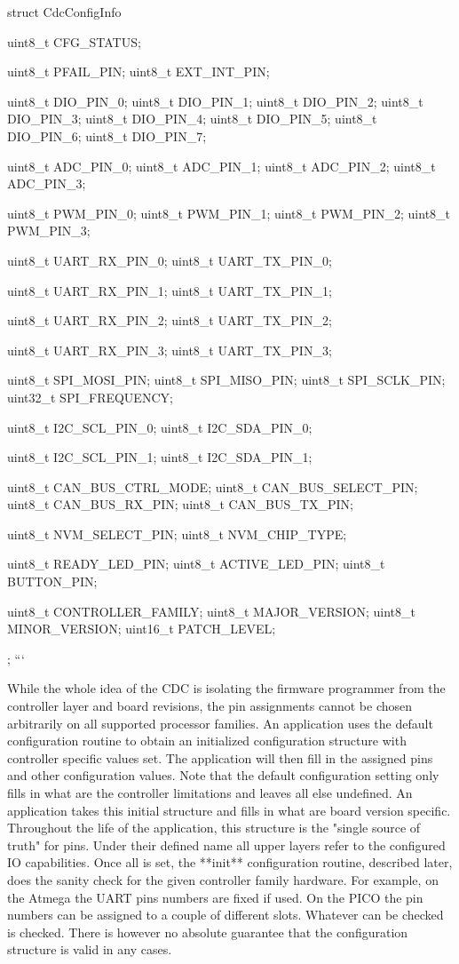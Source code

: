 struct CdcConfigInfo {

    uint8_t   CFG_STATUS;

    uint8_t   PFAIL_PIN;
    uint8_t   EXT_INT_PIN;

    uint8_t   DIO_PIN_0;
    uint8_t   DIO_PIN_1;
    uint8_t   DIO_PIN_2;
    uint8_t   DIO_PIN_3;
    uint8_t   DIO_PIN_4;
    uint8_t   DIO_PIN_5;
    uint8_t   DIO_PIN_6;
    uint8_t   DIO_PIN_7;

    uint8_t   ADC_PIN_0;
    uint8_t   ADC_PIN_1;
    uint8_t   ADC_PIN_2;
    uint8_t   ADC_PIN_3;

    uint8_t   PWM_PIN_0;
    uint8_t   PWM_PIN_1;
    uint8_t   PWM_PIN_2;
    uint8_t   PWM_PIN_3;

    uint8_t   UART_RX_PIN_0;
    uint8_t   UART_TX_PIN_0;

    uint8_t   UART_RX_PIN_1;
    uint8_t   UART_TX_PIN_1;

    uint8_t   UART_RX_PIN_2;
    uint8_t   UART_TX_PIN_2;

    uint8_t   UART_RX_PIN_3;
    uint8_t   UART_TX_PIN_3;

    uint8_t   SPI_MOSI_PIN;
    uint8_t   SPI_MISO_PIN;
    uint8_t   SPI_SCLK_PIN;
    uint32_t  SPI_FREQUENCY;

    uint8_t   I2C_SCL_PIN_0;
    uint8_t   I2C_SDA_PIN_0;

    uint8_t   I2C_SCL_PIN_1;
    uint8_t   I2C_SDA_PIN_1;

    uint8_t   CAN_BUS_CTRL_MODE;
    uint8_t   CAN_BUS_SELECT_PIN;
    uint8_t   CAN_BUS_RX_PIN;
    uint8_t   CAN_BUS_TX_PIN;

    uint8_t   NVM_SELECT_PIN;
    uint8_t   NVM_CHIP_TYPE;

    uint8_t   READY_LED_PIN;
    uint8_t   ACTIVE_LED_PIN;
    uint8_t   BUTTON_PIN;

    uint8_t   CONTROLLER_FAMILY;
    uint8_t   MAJOR_VERSION;
    uint8_t   MINOR_VERSION;
    uint16_t  PATCH_LEVEL;
  };
```

While the whole idea of the CDC is isolating the firmware programmer from the controller layer and board revisions, the pin assignments cannot be chosen arbitrarily on all supported processor families. An application uses the default configuration routine to obtain an initialized configuration structure with controller specific values set. The application will then fill in the assigned pins and other configuration values. Note that the default configuration setting only fills in what are the controller limitations and leaves all else undefined. An application takes this initial structure and fills in what are board version specific. Throughout the life of the application, this structure is the "single source of truth" for pins. Under their defined name all upper layers refer to the configured IO capabilities. Once all is set, the **init** configuration routine, described later, does the sanity check for the given controller family hardware. For example, on the Atmega the UART pins numbers are fixed if used. On the PICO the pin numbers can be assigned to a couple of different slots. Whatever can be checked is checked. There is however no absolute guarantee that the configuration structure is valid in any cases.

